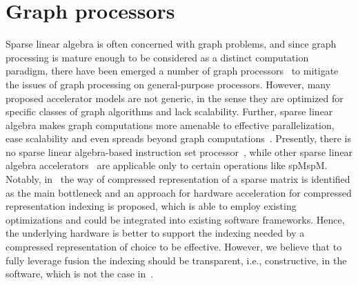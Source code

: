\documentclass[10pt,conference]{IEEEtran}
\begin{document}

\section{Graph processors}
Sparse linear algebra is often concerned with graph problems, and since
graph processing is mature enough to be considered as a distinct computation paradigm, there have been emerged a number of graph processors~\cite{GraphProcessors} to mitigate the issues of graph processing on general-purpose processors.
However, many proposed accelerator models are not generic, in the sense they are optimized for specific
classes of graph algorithms and lack scalability. Further, sparse linear algebra makes graph computations more amenable to effective parallelization, ease scalability and even spreads beyond graph computations~\cite{compBio}. 
Presently, there is no sparse linear algebra-based instruction set processor~\cite{Song_2016},
while other sparse linear algebra accelerators~\cite{CPU-FPGA,OuterSpace,zhang2020sparch} are applicable only to certain operations like spMspM.
Notably, in~\cite{smash} the way of compressed representation of a sparse matrix is identified as the main bottleneck and an approach for hardware acceleration for compressed representation indexing is proposed, which is able to employ existing optimizations and could be integrated into existing software frameworks.
Hence, the underlying hardware is better to support the indexing needed by a compressed representation of choice to be effective.
However, we believe that to fully leverage fusion the indexing should be transparent, i.e., constructive, in the software, which is not the case in~\cite{smash}.
\end{document}
